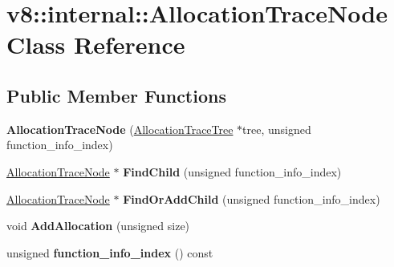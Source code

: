 \hypertarget{classv8_1_1internal_1_1_allocation_trace_node}{}\section{v8\+:\+:internal\+:\+:Allocation\+Trace\+Node Class Reference}
\label{classv8_1_1internal_1_1_allocation_trace_node}
\subsection*{Public Member Functions}
\begin{DoxyCompactItemize}
\item 
{\bfseries Allocation\+Trace\+Node} (\hyperlink{classv8_1_1internal_1_1_allocation_trace_tree}{Allocation\+Trace\+Tree} $\ast$tree, unsigned function\+\_\+info\+\_\+index)\hypertarget{classv8_1_1internal_1_1_allocation_trace_node_aca8caa93d6a5309e2fc2529b71a5a70a}{}\label{classv8_1_1internal_1_1_allocation_trace_node_aca8caa93d6a5309e2fc2529b71a5a70a}

\item 
\hyperlink{classv8_1_1internal_1_1_allocation_trace_node}{Allocation\+Trace\+Node} $\ast$ {\bfseries Find\+Child} (unsigned function\+\_\+info\+\_\+index)\hypertarget{classv8_1_1internal_1_1_allocation_trace_node_afbb942277677c19a257ff8781f034c1d}{}\label{classv8_1_1internal_1_1_allocation_trace_node_afbb942277677c19a257ff8781f034c1d}

\item 
\hyperlink{classv8_1_1internal_1_1_allocation_trace_node}{Allocation\+Trace\+Node} $\ast$ {\bfseries Find\+Or\+Add\+Child} (unsigned function\+\_\+info\+\_\+index)\hypertarget{classv8_1_1internal_1_1_allocation_trace_node_a780262d490b639c1782e3a7212297709}{}\label{classv8_1_1internal_1_1_allocation_trace_node_a780262d490b639c1782e3a7212297709}

\item 
void {\bfseries Add\+Allocation} (unsigned size)\hypertarget{classv8_1_1internal_1_1_allocation_trace_node_ab3952f0610968cabfdb6a6134395f4a8}{}\label{classv8_1_1internal_1_1_allocation_trace_node_ab3952f0610968cabfdb6a6134395f4a8}

\item 
unsigned {\bfseries function\+\_\+info\+\_\+index} () const \hypertarget{classv8_1_1internal_1_1_allocation_trace_node_a7615a9d517ad2c292ef197fa5178afef}{}\label{classv8_1_1internal_1_1_allocation_trace_node_a7615a9d517ad2c292ef197fa5178afef}


\end{DoxyCompactItemize}
